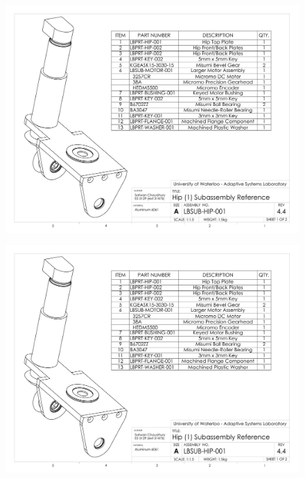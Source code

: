 \begin{figure}[!h]
	\begin{center}
    \includegraphics[scale=0.72,angle=90]{fig/drawings/lbsub-hip-001.pdf}
	\end{center}
\end{figure}

\begin{figure}[!h]
	\begin{center}
    \includegraphics[scale=0.72,angle=90,page=2]{fig/drawings/lbsub-hip-001.pdf}
	\end{center}
\end{figure}

